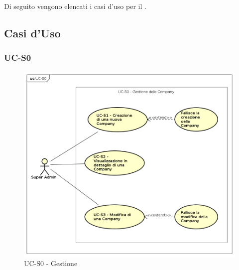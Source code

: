\section{}

Di seguito vengono elencati i casi d'uso per il .

\newpage

\subsection{Casi d'Uso}

\subsubsection{UC-S0}

    \begin{figure}[h]
      \begin{center}
        \includegraphics[width=12cm]{res/img/UCSuperadmin/UC-S0.png}
      \caption{UC-S0 - Gestione }
      \end{center} 
    \end{figure}    
    
